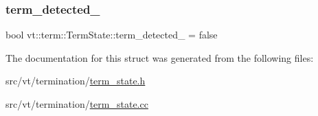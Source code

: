 \subsubsection{\texorpdfstring{term\+\_\+detected\+\_\+}{term\_detected\_}}
{\footnotesize\ttfamily bool vt\+::term\+::\+Term\+State\+::term\+\_\+detected\+\_\+ = false\hspace{0.3cm}{\ttfamily [private]}}



The documentation for this struct was generated from the following files\+:\begin{DoxyCompactItemize}
\item 
src/vt/termination/\hyperlink{term__state_8h}{term\+\_\+state.\+h}\item 
src/vt/termination/\hyperlink{term__state_8cc}{term\+\_\+state.\+cc}\end{DoxyCompactItemize}
